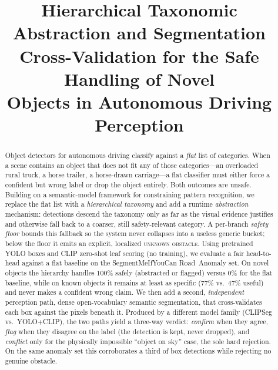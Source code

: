 \documentclass[conference]{IEEEtran}
\begin{document}
\title{Hierarchical Taxonomic Abstraction and Segmentation\\
Cross-Validation for the Safe Handling of Novel\\
Objects in Autonomous Driving Perception}

\author{
}

\maketitle

\begin{abstract}
Object detectors for autonomous driving classify against a \emph{flat} list of
categories. When a scene contains an object that does not fit any of those
categories---an overloaded rural truck, a horse trailer, a horse-drawn
carriage---a flat classifier must either force a confident but wrong label or
drop the object entirely. Both outcomes are unsafe. Building on a semantic-model
framework for constraining pattern recognition, we replace the flat list with a
\emph{hierarchical taxonomy} and add a runtime \emph{abstraction} mechanism:
detections descend the taxonomy only as far as the visual evidence justifies and
otherwise fall back to a coarser, still safety-relevant category. A per-branch
\emph{safety floor} bounds this fallback so the system never collapses into a
useless generic bucket; below the floor it emits an explicit, localized
\textsc{unknown obstacle}. Using pretrained YOLO boxes and CLIP zero-shot leaf
scoring (no training), we evaluate a fair head-to-head against a flat baseline on
the SegmentMeIfYouCan Road~Anomaly set. On novel objects the hierarchy handles
$100\%$ safely (abstracted or flagged) versus $0\%$ for the flat baseline, while
on known objects it remains at least as specific ($77\%$ vs.\ $47\%$ useful) and
never makes a confident wrong claim. We then add a second, \emph{independent}
perception path, dense open-vocabulary semantic segmentation, that
cross-validates each box against the pixels beneath it. Produced by a different
model family (CLIPSeg vs.\ YOLO+CLIP), the two paths yield a three-way verdict:
\emph{confirm} when they agree, \emph{flag} when they disagree on the label (the
detection is kept, never dropped), and \emph{conflict} only for the physically
impossible ``object on sky'' case, the sole hard rejection. On the same anomaly
set this corroborates a third of box detections while rejecting no genuine
obstacle.
\end{abstract}
\end{document}
